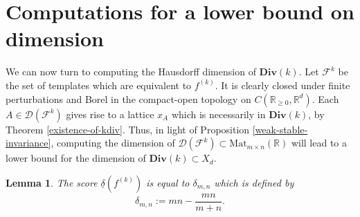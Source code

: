 \documentclass[reqno,11pt]{amsart}
\theoremstyle{plain}
\newtheorem{lem}[thm]{Lemma}
\theoremstyle{definition}
\theoremstyle{remark}
\numberwithin{equation}{section}
\newcommand{\D}{\mathbf{Div}}
\newcommand{\R}{{\mathbb{R}}}
\begin{document}
\section{Computations for a lower bound on dimension}
We can now turn to computing the Hausdorff dimension of $\D(k)$.
Let $\mathcal{F}^k$ be the set of templates which are equivalent to $f^{(k)}$. It is clearly closed under finite perturbations and Borel in the compact-open topology on $C(\R_{\geq 0},\R^d)$.
Each $A \in \mathcal{D}(\mathcal{F}^k)$ gives rise to a lattice $x_A$ which is necessarily in $\D(k)$, by Theorem \ref{existence-of-kdiv}.
Thus, in light of Proposition \ref{weak-stable-invariance}, computing the dimension of $\mathcal{D}(\mathcal{F}^k) \subset \text{Mat}_{m\times n} (\R)$ will lead to a lower bound for the dimension of $\D(k) \subset X_d$.
\begin{lem}
The score $\underline{\delta}(f^{(k)})$ is equal to $\delta_{m,n}$ which is defined by
\begin{equation}\label{eq:deltamn}
    \delta_{m,n} := mn - \frac{mn}{m+n}.
\end{equation}
\end{lem}
\end{document}
